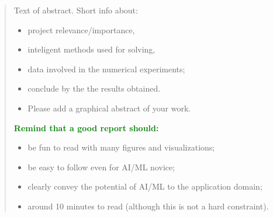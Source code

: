 \begin{abstract}
	Text of abstract. Short info about: 
	\begin{itemize}
		\item project relevance/importance, 
		\item inteligent methods used for solving, 
		\item data involved in the numerical experiments; 
		\item conclude by the the results obtained.
		\item Please add a graphical abstract of your work. 
	\end{itemize}

\noindent
\textbf{\textcolor{green}{Remind that a good report should:}}
\begin{itemize}	
	\item be fun to read with many figures and visualizations;
	\item be easy to follow even for AI/ML novice;
	\item clearly convey the potential of AI/ML to the application domain;
	\item around 10 minutes to read (although this is not a hard constraint).
\end{itemize}
\end{abstract}